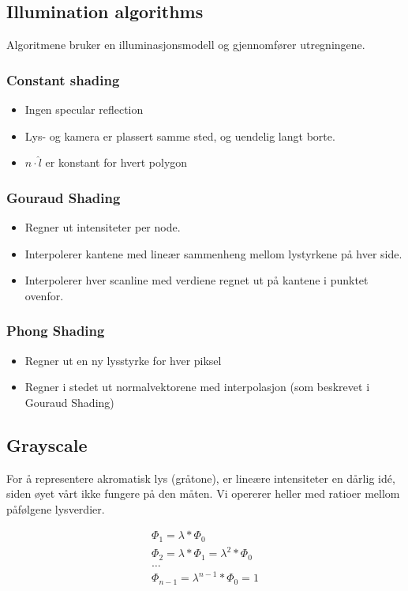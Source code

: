 \subsection{Illumination algorithms}
Algoritmene bruker en illuminasjonsmodell og gjennomfører utregningene.
\subsubsection{Constant shading}
\begin{itemize}
    \item Ingen specular reflection
    \item Lys- og kamera er plassert samme sted, og uendelig langt borte.
    \item $\hat n \cdot \hat l$ er konstant for hvert polygon
\end{itemize}

\subsubsection{Gouraud Shading}
\begin{itemize}
    \item Regner ut intensiteter per node.
    \item Interpolerer kantene med lineær sammenheng mellom lystyrkene på hver side.
    \item Interpolerer hver scanline med verdiene regnet ut på kantene i punktet ovenfor.
\end{itemize}

\subsubsection{Phong Shading}
\begin{itemize}
    \item Regner ut en ny lysstyrke for hver piksel
    \item Regner i stedet ut normalvektorene med interpolasjon (som beskrevet i Gouraud Shading)
\end{itemize}

\subsection{Grayscale}
For å representere akromatisk lys (gråtone), er lineære intensiteter en dårlig idé, siden øyet vårt ikke fungere på den måten. Vi opererer heller med ratioer mellom påfølgene lysverdier.

\begin{equation}
    \begin{aligned}
    \Phi_1 = \lambda * \Phi_0 \\
    \Phi_2 = \lambda * \Phi_1 = \lambda^2*\Phi_0 \\
    \dots \\
    \Phi_{n-1} = \lambda^{n-1} * \Phi_0 = 1
    \end{aligned}
\end{equation}
    

